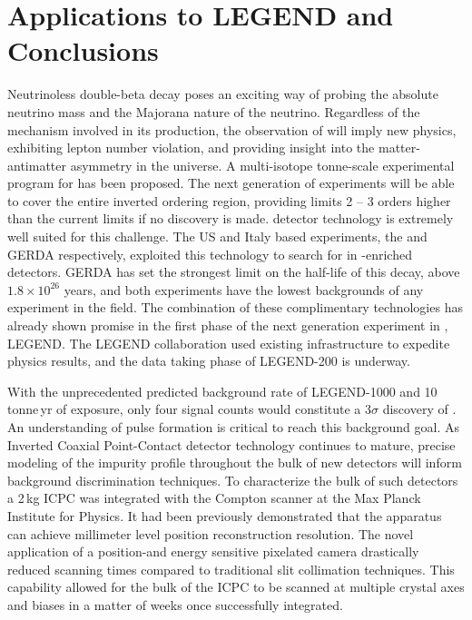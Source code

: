 \chapter{Applications to LEGEND and Conclusions} 

Neutrinoless double-beta decay poses an exciting way of probing the absolute neutrino mass and the Majorana nature of the neutrino.  Regardless of the mechanism involved in its production, the observation of \novbb{} will imply new physics, exhibiting lepton number violation, and providing insight into the matter-antimatter asymmetry in the universe. A multi-isotope tonne-scale experimental program for \novbb{} has been proposed. The next generation of experiments will be able to cover the entire inverted ordering region, providing limits 2 -- 3 orders higher than the current limits if no discovery is made. \geEn{} detector technology is extremely well suited for this challenge. The US and Italy based experiments, the {\MJDEMit} and GERDA respectively, exploited this technology to search for \novbb{} in \geEn{}-enriched detectors. GERDA has set the strongest limit on the half-life of this decay, above $1.8 \times 10^{26}$ years, and both experiments have the lowest backgrounds of any experiment in the field. The combination of these complimentary technologies has already shown promise in the first phase of the next generation experiment in \geEn{}, LEGEND. The LEGEND collaboration used existing infrastructure to expedite physics results, and the data taking phase of LEGEND-200 is underway. 

With the unprecedented predicted background rate of LEGEND-1000 and 10\,tonne\,yr of exposure, only four signal counts would constitute a 3$\sigma$ discovery of \novbb{}. An understanding of pulse formation is critical to reach this background goal. As Inverted Coaxial Point-Contact detector technology continues to mature, precise modeling of the impurity profile throughout the bulk of new detectors will inform background discrimination techniques. To characterize the bulk of such detectors a 2\,kg ICPC was integrated with the Compton scanner at the Max Planck Institute for Physics. It had been previously demonstrated that the apparatus can achieve millimeter level position reconstruction resolution. The novel application of a position-and energy sensitive pixelated camera drastically reduced scanning times compared to traditional slit collimation techniques. This capability allowed for the bulk of the ICPC to be scanned at multiple crystal axes and biases in a matter of weeks once successfully integrated. 

